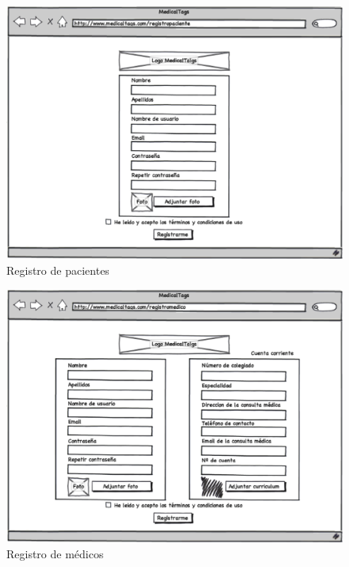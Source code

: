 \documentclass[a4paper,oneside,11pt]{book}
\begin{document}
			\begin{figure}[H]
			  \centering
			    \includegraphics[width=12cm]{img/eps/3_Registro_Paciente.eps}
			  \caption{Registro de pacientes}
			  \label{fig:registro_paciente}
			\end{figure}
			
			\begin{figure}[H]
			  \centering
			    \includegraphics[width=12cm]{img/eps/2_Registro_Medico.eps}
			  \caption{Registro de médicos}
			  \label{fig:registro_medico}
			\end{figure}
			
\end{document}
